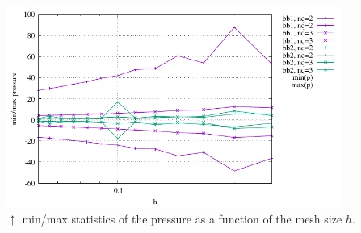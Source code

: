 


\begin{center}
\includegraphics[width=11cm]{python_codes/fieldstone_75/results/mms3D/p_stats.pdf}\\
{\captionfont $\uparrow$ min/max statistics of the pressure as a function of the mesh size $h$.}
\end{center}


